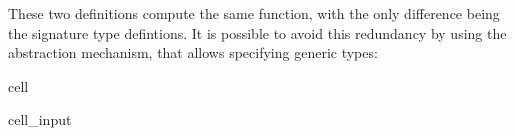 \documentclass[a4paper,10pt,english]{jupyterBook}
\begin{document}
\sphinxAtStartPar
These two definitions compute the same function, with the only difference being the signature type defintions. It is possible to avoid this redundancy by using the  abstraction mechanism, that allows specifying generic types:

\begin{sphinxuseclass}{cell}\begin{sphinxVerbatimInput}

\begin{sphinxuseclass}{cell_input}
\begin{sphinxVerbatim}[commandchars=\\\{\}]

\end{sphinxVerbatim}

\end{sphinxuseclass}\end{sphinxVerbatimInput}

\end{sphinxuseclass}
\end{document}
